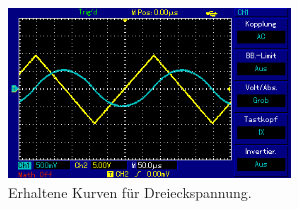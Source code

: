 \begin{figure}[H]
  \centering
  \includegraphics[height=4.5cm]{oz6.png}
  \caption{Erhaltene Kurven für Dreieckspannung.}
  \label{fig:s_s}
\end{figure}
